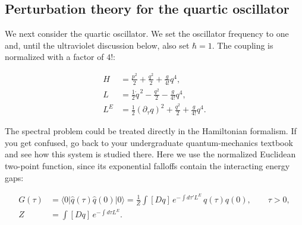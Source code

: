 \subsection{Perturbation theory for the quartic oscillator}
\label{sec:253a-quartic-oscillator}

We next consider the quartic oscillator. We set the oscillator frequency to
one and, until the ultraviolet discussion below, also set $\hbar=1$. The
coupling is normalized with a factor of $4!$:

\begin{equation}
 \begin{aligned}
 H&=\frac{p^2}{2}+\frac{q^2}{2}+\frac{g}{4!}q^4,\\
 L&=\frac{1}{2}\dot q^{\,2}-\frac{q^2}{2}-\frac{g}{4!}q^4,\\
 L^E&=\frac{1}{2}(\partial_\tau q)^2+\frac{q^2}{2}+\frac{g}{4!}q^4.
 \end{aligned}
 \label{eq:253a-quartic-actions}
\end{equation}

The spectral problem could be treated directly in the Hamiltonian formalism.
If you get confused, go back to your undergraduate quantum-mechanics textbook
and see how this system is studied there. Here we use the normalized Euclidean
two-point function, since its exponential falloffs contain the interacting
energy gaps:

\begin{equation}
 \begin{aligned}
 G(\tau)&=\langle0|\widehat q(\tau)\widehat q(0)|0\rangle
 =\frac{1}{Z}\int[Dq]\,e^{-\int d\tau' L^E}\,q(\tau)q(0),
 \qquad \tau>0,\\
 Z&=\int[Dq]\,e^{-\int d\tau L^E}.
 \end{aligned}
 \label{eq:253a-quartic-correlator}
\end{equation}

